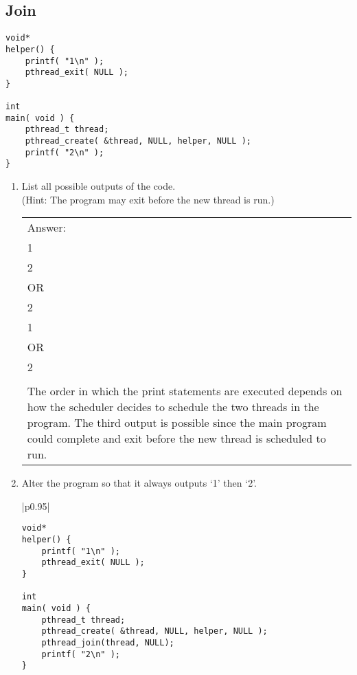 \documentclass[11pt,a4paper]{article}
\newenvironment{answer}
   {\begin{center}
    \begin{tabular}{|p{0.95\textwidth}|}
    \hline
    }
    { 
    \\\hline
    \end{tabular} 
    \end{center}
    }
\begin{document}
\subsection{Join}
\begin{shaded}
\begin{lstlisting}
void*
helper() {
	printf( "1\n" );
	pthread_exit( NULL );
}

int
main( void ) {
	pthread_t thread;
	pthread_create( &thread, NULL, helper, NULL );
	printf( "2\n" );
}
\end{lstlisting}
\end{shaded}
\begin{enumerate}
\item List all possible outputs of the code.\\(Hint: The program may exit before the new thread is run.)
\begin{answer}
\color{red}Answer:\\
1\\
2\\
OR\\
2\\
1\\
OR\\
2\\\\
The order in which the print statements are executed depends on how the scheduler decides to schedule the two threads in the program. The third output is possible since the main program could complete and exit before the new thread is scheduled to run.
\end{answer}
\item Alter the program so that it always outputs `1' then `2'.
\begin{answer}
\begin{lstlisting}
void*
helper() {
	printf( "1\n" );
	pthread_exit( NULL );
}

int
main( void ) {
	pthread_t thread;
	pthread_create( &thread, NULL, helper, NULL );
	pthread_join(thread, NULL);
	printf( "2\n" );
}
\end{lstlisting}
\end{answer}
\end{enumerate}
\end{document}
